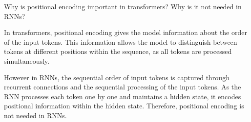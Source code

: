 Why is positional encoding important in transformers? Why is it not needed in RNNs?

\begin{tcolorbox}
In transformers, positional encoding gives the model information about the order of the input tokens. This information allows the model to distinguish between tokens at different positions within the sequence, as all tokens are processed simultaneously.

\vspace{2mm}

However in RNNs, the sequential order of input tokens is captured through recurrent connections and the sequential processing of the input tokens. As the RNN processes each token one by one and maintains a hidden state, it encodes positional information within the hidden state. Therefore, positional encoding is not needed in RNNs.
\end{tcolorbox}
